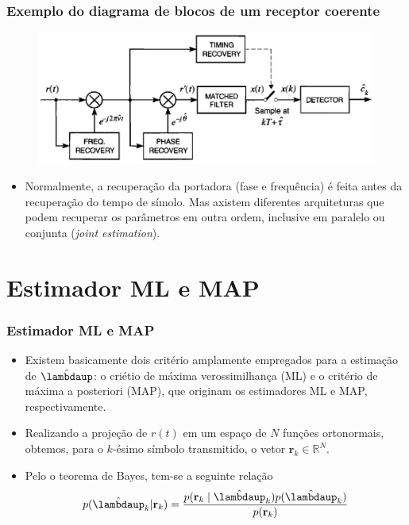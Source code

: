 \begin{frame}[t]
	\frametitle{Exemplo do diagrama de blocos de um receptor coerente}
    \begin{figure}
        \includegraphics[width=0.8\columnwidth]{figs/example.png}
    \end{figure}
	\begin{itemize}
        \item Normalmente, a recuperação da portadora (fase e frequência) é feita antes da recuperação do tempo de símolo. Mas axistem diferentes arquiteturas que podem recuperar os parâmetros em outra ordem, inclusive em paralelo ou conjunta (\textit{joint estimation}).
    \end{itemize}
\end{frame}

\section{Estimador ML e MAP}

\begin{frame}
	\frametitle{Estimador ML e MAP}
	\begin{itemize}
		
		\item Existem basicamente dois critério amplamente empregados para a estimação de \(\hat{\boldsymbol{\lambdaup}}\): o criétio de máxima verossimilhança (ML) e o critério de máxima a posteriori (MAP), que originam os estimadores ML e MAP, respectivamente.
		
		\item Realizando a projeção de \(r(t)\) em um espaço de \(N\) funções ortonormais, obtemos, para o \(k\)-ésimo símbolo transmitido, o vetor \(\mathbf{r}_k \in \mathbb{R}^N\).
		
        \item Pelo o teorema de Bayes, tem-se a seguinte relação
        \begin{align}
            p(\hat{\boldsymbol{\lambdaup}}_k | \mathbf{r}_k) = \dfrac{p(\mathbf{r}_k \mid \hat{\boldsymbol{\lambdaup}}_k) p(\hat{\boldsymbol{\lambdaup}}_k)}{p(\mathbf{r}_k)}
        \end{align}

	\end{itemize}
\end{frame}

